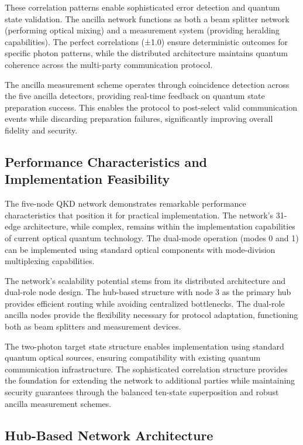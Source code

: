 \documentclass[11pt,a4paper]{article}
\begin{document}
These correlation patterns enable sophisticated error detection and quantum state validation. The ancilla network functions as both a beam splitter network (performing optical mixing) and a measurement system (providing heralding capabilities). The perfect correlations (±1.0) ensure deterministic outcomes for specific photon patterns, while the distributed architecture maintains quantum coherence across the multi-party communication protocol.

The ancilla measurement scheme operates through coincidence detection across the five ancilla detectors, providing real-time feedback on quantum state preparation success. This enables the protocol to post-select valid communication events while discarding preparation failures, significantly improving overall fidelity and security.

\subsection{Performance Characteristics and Implementation Feasibility}

The five-node QKD network demonstrates remarkable performance characteristics that position it for practical implementation. The network's 31-edge architecture, while complex, remains within the implementation capabilities of current optical quantum technology. The dual-mode operation (modes 0 and 1) can be implemented using standard optical components with mode-division multiplexing capabilities.

The network's scalability potential stems from its distributed architecture and dual-role node design. The hub-based structure with node 3 as the primary hub provides efficient routing while avoiding centralized bottlenecks. The dual-role ancilla nodes provide the flexibility necessary for protocol adaptation, functioning both as beam splitters and measurement devices.

The two-photon target state structure enables implementation using standard quantum optical sources, ensuring compatibility with existing quantum communication infrastructure. The sophisticated correlation structure provides the foundation for extending the network to additional parties while maintaining security guarantees through the balanced ten-state superposition and robust ancilla measurement schemes.

\subsection{Hub-Based Network Architecture}
\end{document}
